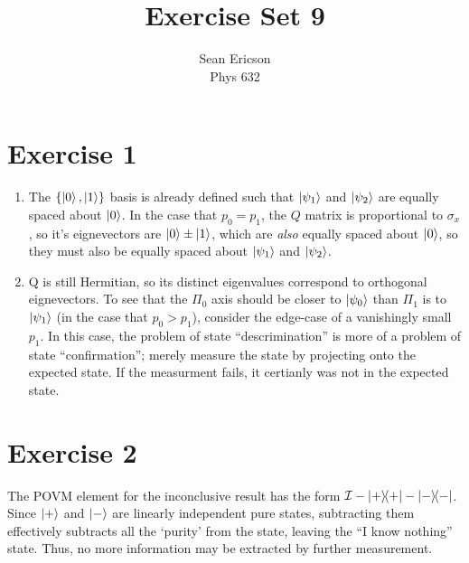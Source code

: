\documentclass[12pt]{article}
\begin{document}
	
\title{Exercise Set 9}
\author{Sean Ericson \\ Phys 632}
\maketitle

\section*{Exercise 1}
\begin{enumerate}[label=(\alph*)]
    \item The $\{\ket{0}, \ket{1}\}$ basis is already defined such that $\ket{\psi_1}$ and $\ket{\psi_2}$ are equally spaced about $\ket{0}$. In the case that $p_0 = p_1$, the $Q$ matrix is proportional to $\sigma_x$, so it's eignevectors are $\ket{0}\pm\ket{1}$, which are \textit{also} equally spaced about $\ket{0}$, so they must also be equally spaced about $\ket{\psi_1}$ and $\ket{\psi_2}$.
    \item Q is still Hermitian, so its distinct eigenvalues correspond to orthogonal eignevectors. To see that the $\Pi_0$ axis should be closer to $\ket{\psi_0}$ than $\Pi_1$ is to $\ket{\psi_1}$ (in the case that $p_0 > p_1$), consider the edge-case of a vanishingly small $p_1$. In this case, the problem of state ``descrimination'' is more of a problem of state ``confirmation''; merely measure the state by projecting onto the expected state. If the measurment fails, it certianly was not in the expected state.
\end{enumerate}

\section*{Exercise 2}
The POVM element for the inconclusive result has the form $\mathcal{I} - \dyad{+} - \dyad{-}$. Since $\ket{+}$ and $\ket{-}$ are linearly independent pure states, subtracting them effectively subtracts all the `purity' from the state, leaving the ``I know nothing'' state. Thus, no more information may be extracted by further measurement.
\end{document}
